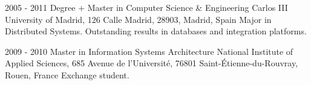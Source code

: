 
\begin{rlist}
  \item 
    \education
      {2005 - 2011}
      {Degree + Master in Computer Science \& Engineering}
      {Carlos III University of Madrid, 126 Calle Madrid, 28903, Madrid, Spain}
      {Major in Distributed Systems. Outstanding results in databases and integration platforms.}
  \item 
    \education
      {2009 - 2010}
      {Master in Information Systems Architecture}
      {National Institute of Applied Sciences, 685 Avenue de l’Université, 76801 Saint-Étienne-du-Rouvray, Rouen, France}
      {Exchange student.} 
\end{rlist}

